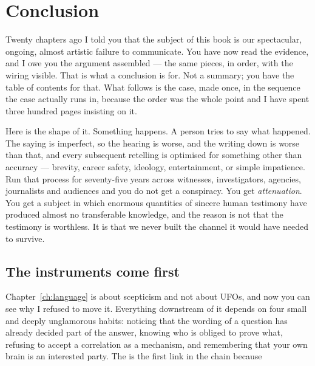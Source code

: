 \clearpage
\chapter*{Conclusion}


Twenty chapters ago I told you that the subject of this book is our spectacular,
ongoing, almost artistic failure to communicate. You have now read the evidence,
and I owe you the argument assembled --- the same pieces, in order, with the
wiring visible. That is what a conclusion is for. Not a summary; you have the
table of contents for that. What follows is the case, made once, in the sequence
the case actually runs in, because the order was the whole point and I have spent
three hundred pages insisting on it.

Here is the shape of it.  Something happens. A person tries to say what happened. The
saying is imperfect, so the hearing is worse, and the writing down is worse than
that, and every subsequent retelling is optimised for something other than
accuracy --- brevity, career safety, ideology, entertainment, or simple
impatience. Run that process for seventy-five years across witnesses,
investigators, agencies, journalists and audiences and you do not get a
conspiracy. You get \emph{attenuation}. You get a subject in which enormous
quantities of sincere human testimony have produced almost no transferable
knowledge, and the reason is not that the testimony is worthless. It is that we
never built the channel it would have needed to survive.

\section*{The instruments come first}

Chapter~\ref{ch:language} is about scepticism and not about UFOs, and now you can
see why I refused to move it. Everything downstream of it depends on four small
and deeply unglamorous habits: noticing that the wording of a question has
already decided part of the answer, knowing who is obliged to prove what,
refusing to accept a correlation as a mechanism, and remembering that your own
brain is an interested party. The  is the first link in the
chain because 

